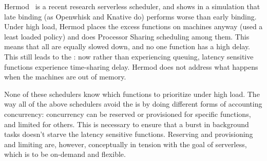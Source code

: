 Hermod~\cite{hermod} is a recent research serverless scheduler, and shows in a
simulation that late binding (as Openwhisk and Knative do) performs worse than
early binding. Under high load, Hermod places the excess functions on machines
anyway (used a least loaded policy) and does Processor Sharing scheduling among
them. This means that all are equally slowed down, and no one function has a
high delay. This still leads to the \problem{}: now rather than experiencing
queuing, latency sensitive functions experience time-sharing delay. Hermod does not
address what happens when the machines are out of memory. 


None of these schedulers 
know which functions to prioritize under high load. The way all of
the above schedulers avoid the \problem{} is by doing different forms of
accounting concurrency: concurrency can be reserved or provisioned for specific
functions, and limited for others. This is necessary to ensure that a burst in
background tasks doesn't starve the latency sensitive functions. Reserving and
provisioning and limiting are, however, conceptually in tension with the goal of
serverless, which is to be on-demand and flexible.



